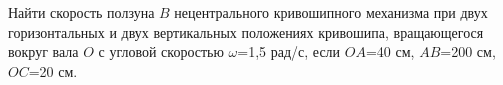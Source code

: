 Найти скорость ползуна $B$ нецентрального кривошипного механизма при
двух горизонтальных и двух вертикальных
положениях кривошипа, вращающегося вокруг вала $O$ с угловой скоростью
$\omega$=1,5 рад/с, если $OA$=40 см, $AB$=200 см,
$OC$=20 см.
